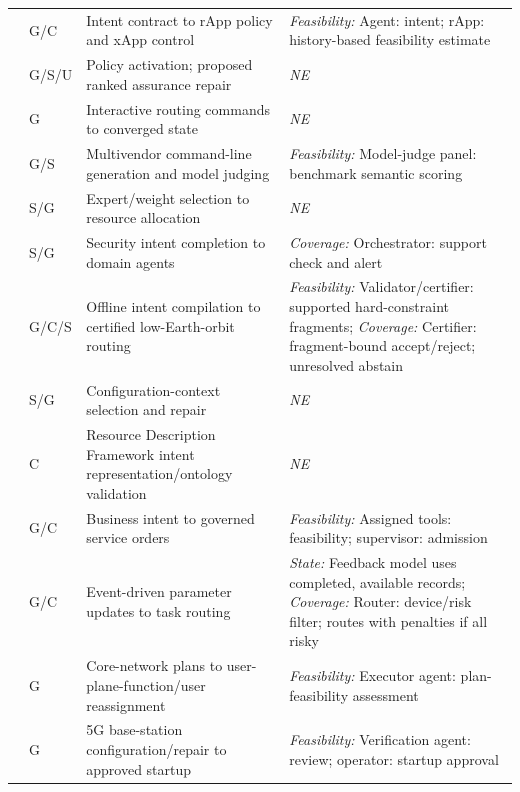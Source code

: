 \begin{longtable}{>{\raggedright\arraybackslash}p{.09\soklitwidth}>{\centering\arraybackslash}p{.07\soklitwidth}>{\raggedright\arraybackslash}p{.36\soklitwidth}>{\raggedright\arraybackslash}p{.48\soklitwidth}}
\addlinespace[1pt]
\cite{e0arxiv260301663} & G/C & Intent contract to rApp policy and xApp control & \emph{Feasibility:} Agent: intent; rApp: history-based feasibility estimate \\
\addlinespace[1pt]
\cite{e0arxiv260323772} & G/S/U & Policy activation; proposed ranked assurance repair & \textit{NE} \\
\addlinespace[1pt]
\cite{e0arxiv260409678} & G & Interactive routing commands to converged state & \textit{NE} \\
\addlinespace[1pt]
\cite{e0arxiv260620564} & G/S & Multivendor command-line generation and model judging & \emph{Feasibility:} Model-judge panel: benchmark semantic scoring \\
\addlinespace[1pt]
\cite{e0arxiv260502911} & S/G & Expert/weight selection to resource allocation & \textit{NE} \\
\addlinespace[1pt]
\cite{e0arxiv260406856} & S/G & Security intent completion to domain agents & \emph{Coverage:} Orchestrator: support check and alert \\
\addlinespace[1pt]
\cite{e0arxiv260407264} & G/C/S & Offline intent compilation to certified low-Earth-orbit routing & \emph{Feasibility:} Validator/certifier: supported hard-constraint fragments; \emph{Coverage:} Certifier: fragment-bound accept/reject; unresolved abstain \\
\addlinespace[1pt]
\cite{e0arxiv260422513} & S/G & Configuration-context selection and repair & \textit{NE} \\
\addlinespace[1pt]
\cite{e0arxiv260427359} & C & Resource Description Framework intent representation/ontology validation & \textit{NE} \\
\addlinespace[1pt]
\cite{parra-ullauri2026rolebased} & G/C & Business intent to governed service orders & \emph{Feasibility:} Assigned tools: feasibility; supervisor: admission \\
\addlinespace[1pt]
\cite{e0arxiv260527428} & G/C & Event-driven parameter updates to task routing & \emph{State:} Feedback model uses completed, available records; \emph{Coverage:} Router: device/risk filter; routes with penalties if all risky \\
\addlinespace[1pt]
\cite{e0arxiv260600417} & G & Core-network plans to user-plane-function/user reassignment & \emph{Feasibility:} Executor agent: plan-feasibility assessment \\
\addlinespace[1pt]
\cite{e0arxiv260601222} & G & 5G base-station configuration/repair to approved startup & \emph{Feasibility:} Verification agent: review; operator: startup approval \\

\end{longtable}
